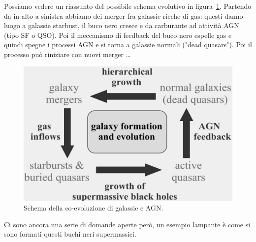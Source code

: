 Possiamo vedere un riassunto del possibile schema evolutivo in figura~\ref{fig:coevolution-galassie-agn}. Partendo da in alto a sinistra abbiamo dei merger fra galassie ricche di gas: questi danno luogo a galassie starbust, il buco nero cresce e da carburante ad attività AGN (tipo SF o QSO). Poi il meccanismo di feedback del buco nero espelle gas e quindi spegne i processi AGN e si torna a galassie normali ("dead quasars"). Poi il processo può riniziare con nuovi merger \dots

\begin{figure}
    \centering
    \includegraphics[width = 0.6 \textwidth]{immagini/coevolution-galassie-agn.png}
    \caption{Schema della co-evoluzione di galassie e AGN.}
    \label{fig:coevolution-galassie-agn}
\end{figure}

Ci sono ancora una serie di domande aperte però, un esempio lampante è come si sono formati questi buchi neri supermassici.